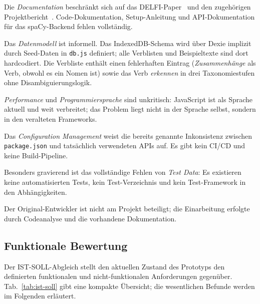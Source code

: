 Die \emph{Documentation} beschränkt sich auf das DELFI-Paper~\cite{loth2022kompetenzeditor} und den zugehörigen Projektbericht~\cite{loth2022masterprojekt}.
Code-Dokumentation, Setup-Anleitung und API-Dokumentation für das spaCy-Backend fehlen vollständig.

Das \emph{Datenmodell} ist informell.
Das IndexedDB-Schema wird über Dexie implizit durch Seed-Daten in \texttt{db.js} definiert; alle Verblisten und Beispieltexte sind dort hardcodiert.
Die Verbliste enthält einen fehlerhaften Eintrag (\emph{Zusammenhänge} als Verb, obwohl es ein Nomen ist) sowie das Verb \emph{erkennen} in drei Taxonomiestufen ohne Disambiguierungslogik.

\emph{Performance} und \emph{Programmiersprache} sind unkritisch: JavaScript ist als Sprache aktuell und weit verbreitet; das Problem liegt nicht in der Sprache selbst, sondern in den veralteten Frameworks.

Das \emph{Configuration Management} weist die bereits genannte Inkonsistenz zwischen \texttt{package.json} und tatsächlich verwendeten APIs auf.
Es gibt kein CI/CD und keine Build-Pipeline.

Besonders gravierend ist das vollständige Fehlen von \emph{Test Data}: Es existieren keine automatisierten Tests, kein Test-Verzeichnis und kein Test-Framework in den Abhängigkeiten.

Der Original-Entwickler ist nicht am Projekt beteiligt; die Einarbeitung erfolgte durch Codeanalyse und die vorhandene Dokumentation.

\subsection{Funktionale Bewertung}\label{sec:funktionale-bewertung}

Der IST-SOLL-Abgleich stellt den aktuellen Zustand des Prototyps den definierten funktionalen und nicht-funktionalen Anforderungen gegenüber.
Tab.~\ref{tab:ist-soll} gibt eine kompakte Übersicht; die wesentlichen Befunde werden im Folgenden erläutert.

